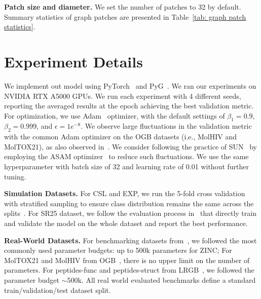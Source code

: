 \documentclass{article}
\begin{document}
\textbf{Patch size and diameter.}
We set the number of patches to 32 by default. Summary statistics of graph patches are presented in Table~\ref{tab: graph patch statistics}.



\section{Experiment Details}\label{app: experiment}

We implement out model using PyTorch~\citep{pytorch} and PyG~\citep{pyg}. We ran our experiments on NVIDIA RTX A5000 GPUs.
We run each experiment with 4 different seeds, reporting the averaged results at the epoch achieving the best validation metric. For optimization, we use Adam~\citep{kingma2014adam} optimizer, with the default settings of $\beta_1=0.9$, $\beta_2=0.999$, and $\epsilon=1e^{-8}$. 
We observe large fluctuations in the validation metric with the common Adam optimizer on the OGB datasets (i.e., MolHIV and MolTOX21), as also observed in~\citep{sun, zhang2021nested, chen2019equivalence}. 
We consider following the practice of SUN~\citep{sun} by employing the ASAM optimizer~\citep{kwon2021asam} to reduce such fluctuations. We use the same hyperparameter with batch size of 32 and learning rate of 0.01 without further tuning.


\textbf{Simulation Datasets.}
For CSL and EXP, we run the 5-fold cross validation with stratified sampling to ensure class distribution remains the same across the splits~\cite{dwivedi2020benchmarking, zhang2021nested}. For SR25 dataset, we follow the evaluation process in~\citep{zhao2021stars, feng2022powerful} that directly train and validate the model on the whole dataset and report the best performance.

\textbf{Real-World Datasets.}
For benchmarking datasets from~\citet{dwivedi2020benchmarking}, we followed the most commonly used parameter budgets:  up to 500k parameters for ZINC; For MolTOX21 and MolHIV from OGB~\citep{hu2020open}, there is no upper limit on the number of parameters. For peptides-func and peptides-struct from LRGB~\citep{dwivedi2022long}, we followed the parameter budget $\sim$500k. All real world evaluated benchmarks define a standard train/validation/test dataset split. 
\end{document}
